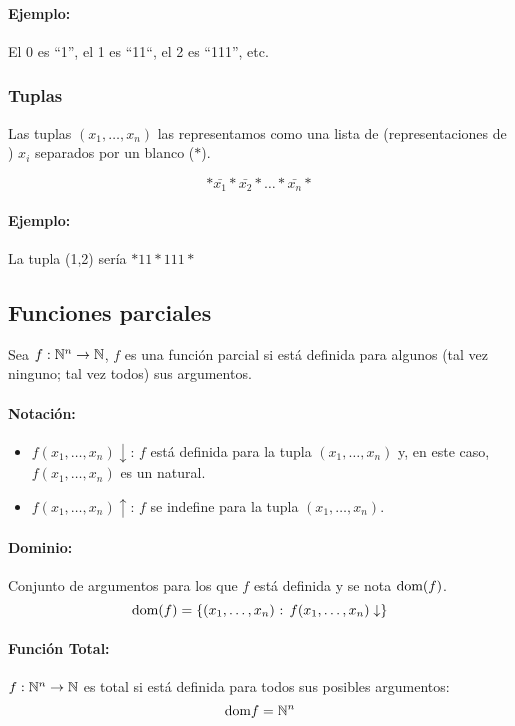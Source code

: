 	\paragraph{Ejemplo:} El 0 es ``1'', el 1 es ``11``, el 2 es ``111'', etc.
	
	\subsubsection{Tuplas}
	Las tuplas $(x_1,\dots,x_n)$ las representamos como una lista de (representaciones de ) $x_i$ separados por un blanco ($*$).
	
	$$*\bar{x_1}*\bar{x_2}*\dots*\bar{x_n}*$$
	
	\paragraph{Ejemplo:} La tupla (1,2) sería $*11*111*$
	\subsection{Funciones parciales}
	Sea $f:\mathbb{N}^n\to\mathbb{N}$, $f$ es una función parcial si está definida para algunos (tal vez ninguno; tal vez todos) sus argumentos. 
	
	\paragraph{Notación:}
	\begin{itemize}
		\item $f(x_1,\dots,x_n)\downarrow$: $f$ está definida para la tupla $(x_1,\dots,x_n)$ y, en este caso, $f(x_1,\dots,x_n)$ es un natural.
		\item $f(x_1,\dots,x_n)\uparrow$: $f$ se indefine para la tupla $(x_1,\dots,x_n)$.
	\end{itemize}

	\paragraph{Dominio:} Conjunto de argumentos para los que $f$ está definida y se nota $\text{dom}(f)$.
	$$\text{dom}(f) = \{(x_1,\dots,x_n) \text{ : } f(x_1,\dots,x_n)\downarrow\}$$ 
	
	\paragraph{Función Total:} $f:\mathbb{N}^n\to\mathbb{N}$ es total si está definida para todos sus posibles argumentos:
	$$\text{dom}{f} = \mathbb{N}^n$$
	
